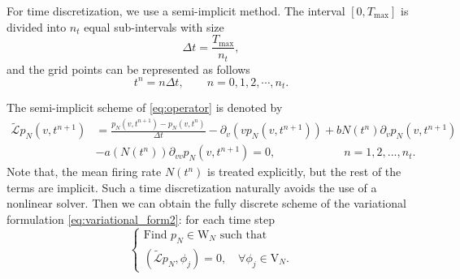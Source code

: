 For time discretization, we use a semi-implicit method. The interval $[0,T_{\text{max}}]$ is divided  into $n_t$ equal sub-intervals with size
\begin{equation}
    \Delta t=\frac{T_{\text{max}}}{n_t},
\end{equation}
and the grid points can be represented as follows
\begin{equation}
    t^{n}=n \Delta t, \qquad n=0,1,2, \cdots, n_{t}.
\end{equation}


The semi-implicit scheme of \eqref{eq:operator} is denoted by
\begin{equation}
    \label{eq:semi_implicit}
\begin{aligned}
    \tilde{\mathcal{L}}p_N(v,t^{n+1})&=\frac{p_N(v,t^{n+1})-p_N(v,t^{n})}{\Delta t}-\partial_v(vp_N(v,t^{n+1}))+bN(t^n)\partial_vp_N(v,t^{n+1})\\
    &-a(N(t^n))\partial_{vv}p_N(v,t^{n+1})=0,\qquad\qquad\qquad n=1,2,...,n_t.
\end{aligned}
\end{equation}
Note that, the mean firing rate $N(t^n)$ is treated explicitly, but the rest of the terms are implicit. Such a time discretization naturally avoids the use of a nonlinear solver. Then we can obtain the fully discrete scheme of the variational formulation \eqref{eq:variational_form2}: for each time step
\begin{equation}
    \label{eq:variational_form3}
    \begin{cases}
       \text{Find } p_N\in \mathrm{W}_{N} \text{ such that}\\
        (\tilde{\mathcal{L}}p_N,\phi_j)=0,\quad \forall \phi_j \in \mathrm{V}_N.
    \end{cases}
\end{equation}

